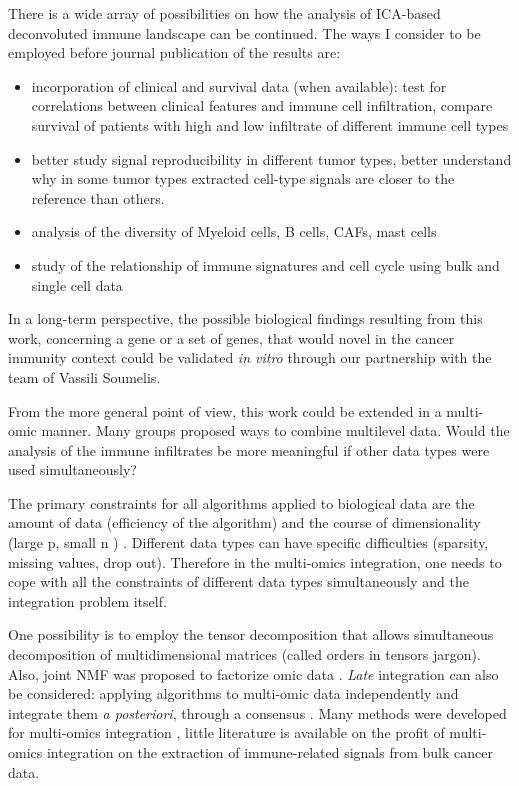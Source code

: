 \documentclass[12pt,]{book}
\providecommand{\tightlist}{%
  \setlength{\itemsep}{0pt}\setlength{\parskip}{0pt}}
\theoremstyle{definition}
\theoremstyle{definition}
\theoremstyle{definition}
\theoremstyle{remark}
\begin{document}
There is a wide array of possibilities on how the analysis of ICA-based
deconvoluted immune landscape can be continued. The ways I consider to
be employed before journal publication of the results are:

\begin{itemize}
\tightlist
\item
  incorporation of clinical and survival data (when available): test for
  correlations between clinical features and immune cell infiltration,
  compare survival of patients with high and low infiltrate of different
  immune cell types
\item
  better study signal reproducibility in different tumor types, better
  understand why in some tumor types extracted cell-type signals are
  closer to the reference than others.
\item
  analysis of the diversity of Myeloid cells, B cells, CAFs, mast cells
\item
  study of the relationship of immune signatures and cell cycle using
  bulk and single cell data
\end{itemize}

In a long-term perspective, the possible biological findings resulting
from this work, concerning a gene or a set of genes, that would novel in
the cancer immunity context could be validated \emph{in vitro} through
our partnership with the team of Vassili Soumelis.

From the more general point of view, this work could be extended in a
multi-omic manner. Many groups proposed ways to combine multilevel data.
Would the analysis of the immune infiltrates be more meaningful if other
data types were used simultaneously?

The primary constraints for all algorithms applied to biological data
are the amount of data (efficiency of the algorithm) and the course of
dimensionality (large p, small n ) \citep{Angerer2017, Maia2017}.
Different data types can have specific difficulties (sparsity, missing
values, drop out). Therefore in the multi-omics integration, one needs
to cope with all the constraints of different data types simultaneously
and the integration problem itself.

One possibility is to employ the tensor decomposition that allows
simultaneous decomposition of multidimensional matrices
\citep{Teschendorff2018, Taguchi2017} (called orders in tensors jargon).
Also, joint NMF was proposed to factorize omic data \citep{Zhang2012}.
\emph{Late} integration can also be considered: applying algorithms to
multi-omic data independently and integrate them \emph{a posteriori},
through a consensus \citep{Bonnet2015}. Many methods were developed for
multi-omics integration \citep{Huang2017}, little literature is
available on the profit of multi-omics integration on the extraction of
immune-related signals from bulk cancer data.
\end{document}
